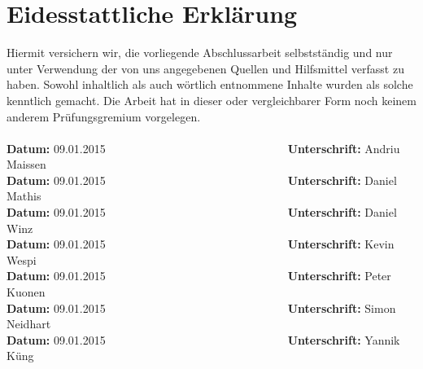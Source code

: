 \section*{Eidesstattliche Erklärung}
\label{erklaerung}
Hiermit versichern wir, die vorliegende Abschlussarbeit selbstständig und nur 
unter Verwendung der von uns angegebenen Quellen und Hilfsmittel verfasst zu 
haben. Sowohl inhaltlich als auch wörtlich entnommene Inhalte wurden als 
solche kenntlich gemacht. Die Arbeit hat in dieser oder vergleichbarer Form 
noch keinem anderem Prüfungsgremium vorgelegen. \\
\newcommand{\signdate}{09.01.2015}
\\[1.5cm]
\textbf{Datum:}	\signdate~~~~~~~~~~~~~~~~~~~~~~~~~~~~~~~~\textbf{Unterschrift:} Andriu Maissen
\\[1.5cm]
\textbf{Datum:}	\signdate~~~~~~~~~~~~~~~~~~~~~~~~~~~~~~~~\textbf{Unterschrift:} Daniel Mathis
\\[1.5cm]
\textbf{Datum:}	\signdate~~~~~~~~~~~~~~~~~~~~~~~~~~~~~~~~\textbf{Unterschrift:} Daniel Winz
\\[1.5cm]
\textbf{Datum:}	\signdate~~~~~~~~~~~~~~~~~~~~~~~~~~~~~~~~\textbf{Unterschrift:} Kevin Wespi
\\[1.5cm]
\textbf{Datum:}	\signdate~~~~~~~~~~~~~~~~~~~~~~~~~~~~~~~~\textbf{Unterschrift:} Peter Kuonen
\\[1.5cm]
\textbf{Datum:}	\signdate~~~~~~~~~~~~~~~~~~~~~~~~~~~~~~~~\textbf{Unterschrift:} Simon Neidhart
\\[1.5cm]
\textbf{Datum:}	\signdate~~~~~~~~~~~~~~~~~~~~~~~~~~~~~~~~\textbf{Unterschrift:} Yannik Küng
